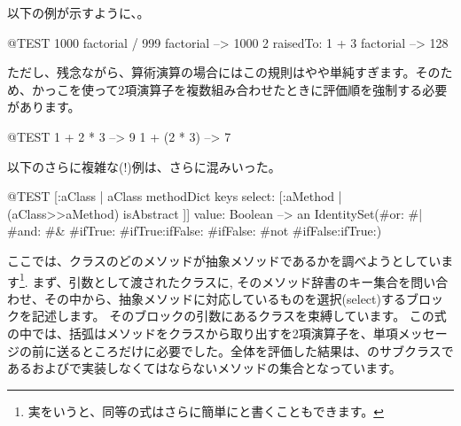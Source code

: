 \documentclass[a4paper,10pt,twoside]{book}
\begin{document}

以下の例が示すように、。
\begin{code}{@TEST}
1000 factorial / 999 factorial --> 1000
2 raisedTo: 1 + 3 factorial     --> 128
\end{code}
\noindent

ただし、残念ながら、算術演算の場合にはこの規則はやや単純すぎます。そのため、かっこを使って2項演算子を複数組み合わせたときに評価順を強制する必要があります。
\begin{code}{@TEST}
1 + 2 * 3   --> 9
1 + (2 * 3) --> 7
\end{code}

以下のさらに複雑な(!)例は、さらに混みいった。
\begin{code}{@TEST}
[:aClass | aClass methodDict keys select: [:aMethod | (aClass>>aMethod) isAbstract ]] value: Boolean --> an IdentitySet(#or: #| #and: #& #ifTrue: #ifTrue:ifFalse: #ifFalse: #not #ifFalse:ifTrue:)
\end{code}
\noindent
ここでは、クラスのどのメソッドが抽象メソッドであるかを調べようとしています\footnote{実をいうと、同等の式はさらに簡単にと書くこともできます。}.
まず、引数として渡されたクラスに, そのメソッド辞書のキー集合を問い合わせ、その中から、抽象メソッドに対応しているものを選択(select)するブロックを記述します。
そのブロックの引数にあるクラスを束縛しています。
この式の中では、括弧はメソッドをクラスから取り出すを2項演算子\ct{>>}を、単項メッセージ\mbox{}の前に送るところだけに必要でした。全体を評価した結果は、のサブクラスであるおよびで実装しなくてはならないメソッドの集合となっています。


\end{document}
